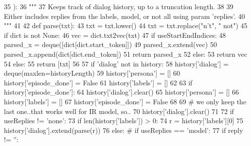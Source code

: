 \begin{DoxyCode}
35 ):
36     \textcolor{stringliteral}{"""}
37 \textcolor{stringliteral}{    Keeps track of dialog history, up to a truncation length.}
38 \textcolor{stringliteral}{}
39 \textcolor{stringliteral}{    Either includes replies from the labels, model, or not all using param 'replies'.}
40 \textcolor{stringliteral}{    """}
41 
42     \textcolor{keyword}{def }parse(txt):
43         txt = txt.lower()
44         txt = txt.replace(\textcolor{stringliteral}{"n't"}, \textcolor{stringliteral}{" not"})
45         \textcolor{keywordflow}{if} dict \textcolor{keywordflow}{is} \textcolor{keywordflow}{not} \textcolor{keywordtype}{None}:
46             vec = dict.txt2vec(txt)
47             \textcolor{keywordflow}{if} useStartEndIndices:
48                 parsed\_x = deque([dict[dict.start\_token]])
49                 parsed\_x.extend(vec)
50                 parsed\_x.append(dict[dict.end\_token])
51                 \textcolor{keywordflow}{return} parsed\_x
52             \textcolor{keywordflow}{else}:
53                 \textcolor{keywordflow}{return} vec
54         \textcolor{keywordflow}{else}:
55             \textcolor{keywordflow}{return} [txt]
56 
57     \textcolor{keywordflow}{if} \textcolor{stringliteral}{'dialog'} \textcolor{keywordflow}{not} \textcolor{keywordflow}{in} history:
58         history[\textcolor{stringliteral}{'dialog'}] = deque(maxlen=historyLength)
59         history[\textcolor{stringliteral}{'persona'}] = []
60         history[\textcolor{stringliteral}{'episode\_done'}] = \textcolor{keyword}{False}
61         history[\textcolor{stringliteral}{'labels'}] = []
62 
63     \textcolor{keywordflow}{if} history[\textcolor{stringliteral}{'episode\_done'}]:
64         history[\textcolor{stringliteral}{'dialog'}].clear()
65         history[\textcolor{stringliteral}{'persona'}] = []
66         history[\textcolor{stringliteral}{'labels'}] = []
67         history[\textcolor{stringliteral}{'episode\_done'}] = \textcolor{keyword}{False}
68 
69     \textcolor{comment}{# we only keep the last one..that works well for IR model, so..}
70     history[\textcolor{stringliteral}{'dialog'}].clear()
71 
72     \textcolor{keywordflow}{if} useReplies != \textcolor{stringliteral}{'none'}:
73         \textcolor{keywordflow}{if} len(history[\textcolor{stringliteral}{'labels'}]) > 0:
74             r = history[\textcolor{stringliteral}{'labels'}][0]
75             history[\textcolor{stringliteral}{'dialog'}].extend(parse(r))
76         \textcolor{keywordflow}{else}:  \textcolor{comment}{# if useReplies == 'model':}
77             \textcolor{keywordflow}{if} reply != \textcolor{stringliteral}{''}:

\end{DoxyCode}
